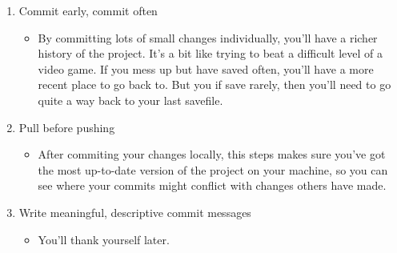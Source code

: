 \documentclass[
]{book}
\providecommand{\tightlist}{%
  \setlength{\itemsep}{0pt}\setlength{\parskip}{0pt}}
\begin{document}
\begin{enumerate}
\def\labelenumi{\arabic{enumi}.}
\tightlist
\item
  Commit early, commit often

  \begin{itemize}
  \tightlist
  \item
    By committing lots of small changes individually, you'll have a richer history of the project. It's a bit like trying to beat a difficult level of a video game. If you mess up but have saved often, you'll have a more recent place to go back to. But you if save rarely, then you'll need to go quite a way back to your last savefile.
  \end{itemize}
\item
  Pull before pushing

  \begin{itemize}
  \tightlist
  \item
    After commiting your changes locally, this steps makes sure you've got the most up-to-date version of the project on your machine, so you can see where your commits might conflict with changes others have made.
  \end{itemize}
\item
  Write meaningful, descriptive commit messages

  \begin{itemize}
  \tightlist
  \item
    You'll thank yourself later.
  \end{itemize}
\end{enumerate}

  
\end{document}
